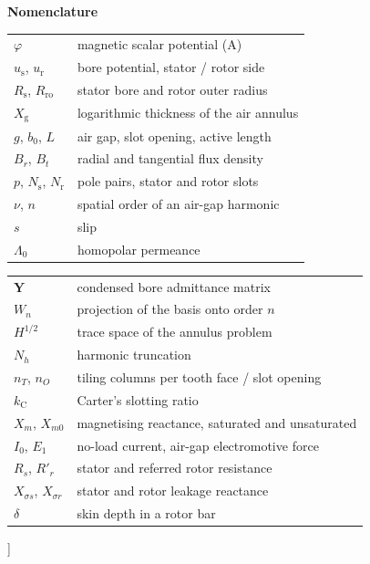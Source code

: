 \documentclass[10pt,a4paper,twocolumn]{article}
\newcommand{\Rs}{R_{\mathrm{s}}}
\newcommand{\Rro}{R_{\mathrm{ro}}}
\newcommand{\Xg}{X_{\mathrm{g}}}
\theoremstyle{plain}
\theoremstyle{remark}
\begin{document}
\begin{center}{\rmfamily\bfseries Nomenclature}\end{center}
\vspace{-1mm}
{\footnotesize
\parbox[t]{0.485\textwidth}{\begin{tabular}{@{}p{16mm}p{56mm}@{}}
$\varphi$ & magnetic scalar potential (A)\\
$u_{\mathrm{s}}$, $u_{\mathrm{r}}$ & bore potential, stator / rotor side\\
$\Rs$, $\Rro$ & stator bore and rotor outer radius\\
$\Xg$ & logarithmic thickness of the air annulus\\
$g$, $b_0$, $L$ & air gap, slot opening, active length\\
$B_r$, $B_t$ & radial and tangential flux density\\
$p$, $N_{\mathrm{s}}$, $N_{\mathrm{r}}$ & pole pairs, stator and rotor slots\\
$\nu$, $n$ & spatial order of an air-gap harmonic\\
$s$ & slip\\
$\Lambda_0$ & homopolar permeance\\
\end{tabular}}\hfill
\parbox[t]{0.485\textwidth}{\begin{tabular}{@{}p{16mm}p{56mm}@{}}
$\bm{Y}$ & condensed bore admittance matrix\\
$W_n$ & projection of the basis onto order $n$\\
$H^{1/2}$ & trace space of the annulus problem\\
$N_h$ & harmonic truncation\\
$n_T$, $n_O$ & tiling columns per tooth face / slot opening\\
$k_{\mathrm{C}}$ & Carter's slotting ratio\\
$X_m$, $X_{m0}$ & magnetising reactance, saturated and unsaturated\\
$I_0$, $E_1$ & no-load current, air-gap electromotive force\\
$R_s$, $R'_r$ & stator and referred rotor resistance\\
$X_{\sigma s}$, $X_{\sigma r}$ & stator and rotor leakage reactance\\
$\delta$ & skin depth in a rotor bar\\
\end{tabular}}\par}

]

\vspace{4mm}
\end{document}
